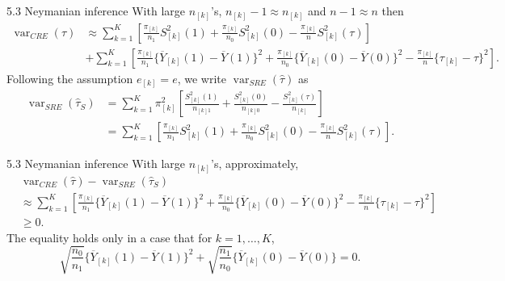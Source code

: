 \documentclass[aspectratio=169, 12pt]{beamer}
\begin{document}
\begin{frame}{5.3 Neymanian inference}
  With large $n_{[k]}$'s, $n_{[k]}-1\approx n_{[k]}$ and $n-1\approx n$ then
  {\footnotesize
    \begin{align*}
  \operatorname{var}_{CRE}(\widehat{\tau}) 
  &\approx \sum_{k=1}^{K}\left[\frac{\pi_{[k]}}{n_1}S_{[k]}^2(1)+\frac{\pi_{[k]}}{n_0}S^2_{[k]}(0)-\frac{\pi_{[k]}}{n}S_{[k]}^2(\tau)\right]\\
  &+ \sum_{k=1}^{K}\left[\frac{\pi_{[k]}}{n_1}\{\overline{Y}_{[k]}(1)-\overline{Y}(1)\}^2+\frac{\pi_{[k]}}{n_0}\{\overline{Y}_{[k]}(0)-\overline{Y}(0)\}^2- \frac{\pi_{[k]}}{n}\{\tau_{[k]}-\tau\}^2\right].
  \end{align*}}
  Following the assumption $e_{[k]}=e$, we write $\operatorname{var}_{SRE}(\widehat{\tau})$ as
  {\footnotesize
    \begin{align*}
    \operatorname{var}_{SRE}(\widehat{\tau}_S)
    &= \sum_{k=1}^{K}\pi_{[k]}^2\left[
      \frac{S_{[k]}^2(1)}{n_{[k]1}} + \frac{S_{[k]}^2(0)}{n_{[k]0}} - \frac{S_{[k]}^2(\tau)}{n_{[k]}}
    \right]\\
    &= \sum_{k=1}^{K}\left[
      \frac{\pi_{[k]}}{n_1}S_{[k]}^2(1) + \frac{\pi_{[k]}}{n_0}S_{[k]}^2(0) - \frac{\pi_{[k]}}{n}S_{[k]}^2(\tau)
    \right].
  \end{align*}}
\end{frame}

\begin{frame}[label=cre_sre_diff]{5.3 Neymanian inference}
  With large $n_{[k]}$'s, approximately, 
  \begin{align}
    &\operatorname{var}_{CRE}(\widehat{\tau}) - \operatorname{var}_{SRE}(\widehat{\tau}_S) \nonumber\\
    &\approx \sum_{k=1}^{K}\left[\frac{\pi_{[k]}}{n_1}\{\overline{Y}_{[k]}(1)-\overline{Y}(1)\}^2+\frac{\pi_{[k]}}{n_0}\{\overline{Y}_{[k]}(0)-\overline{Y}(0)\}^2- \frac{\pi_{[k]}}{n}\{\tau_{[k]}-\tau\}^2\right] \nonumber\\
    &\geq 0.
    \label{eq:sre_var_diff}
  \end{align}
  The equality holds only in a case that for $k=1,\dots,K$,
  \[
  \sqrt{\frac{n_0}{n_1}}\{\overline{Y}_{[k]}(1)-\overline{Y}(1)\}^2 + \sqrt{\frac{n_1}{n_0}}\{\overline{Y}_{[k]}(0)-\overline{Y}(0)\} = 0.
  \]

  \vfill
  \hfill\hyperlink{pf-sre_var_diff<1>}{}
\end{frame}
\end{document}
